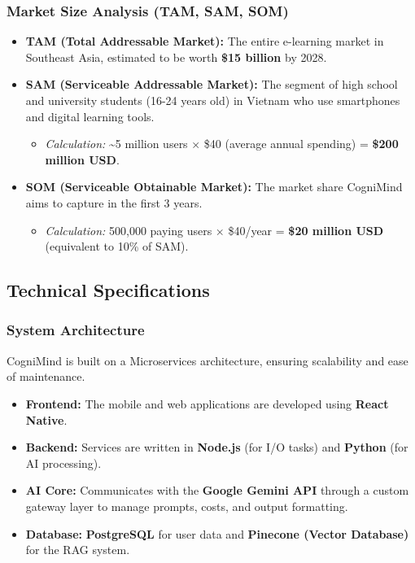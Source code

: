 \subsubsection{Market Size Analysis (TAM, SAM, SOM)}
\begin{itemize}
    \item \textbf{TAM (Total Addressable Market):} The entire e-learning market in Southeast Asia, estimated to be worth \textbf{\$15 billion} by 2028.
    \item \textbf{SAM (Serviceable Addressable Market):} The segment of high school and university students (16-24 years old) in Vietnam who use smartphones and digital learning tools.
    \begin{itemize}
        \item \textit{Calculation:} \textasciitilde5 million users × \$40 (average annual spending) = \textbf{\$200 million USD}.
    \end{itemize}
    \item \textbf{SOM (Serviceable Obtainable Market):} The market share CogniMind aims to capture in the first 3 years.
    \begin{itemize}
        \item \textit{Calculation:} 500,000 paying users × \$40/year = \textbf{\$20 million USD} (equivalent to 10\% of SAM).
    \end{itemize}
\end{itemize}

\subsection{Technical Specifications}

\subsubsection{System Architecture}
CogniMind is built on a Microservices architecture, ensuring scalability and ease of maintenance.
\begin{itemize}
    \item \textbf{Frontend:} The mobile and web applications are developed using \textbf{React Native}.
    \item \textbf{Backend:} Services are written in \textbf{Node.js} (for I/O tasks) and \textbf{Python} (for AI processing).
    \item \textbf{AI Core:} Communicates with the \textbf{Google Gemini API} through a custom gateway layer to manage prompts, costs, and output formatting.
    \item \textbf{Database:} \textbf{PostgreSQL} for user data and \textbf{Pinecone (Vector Database)} for the RAG system.
\end{itemize}

